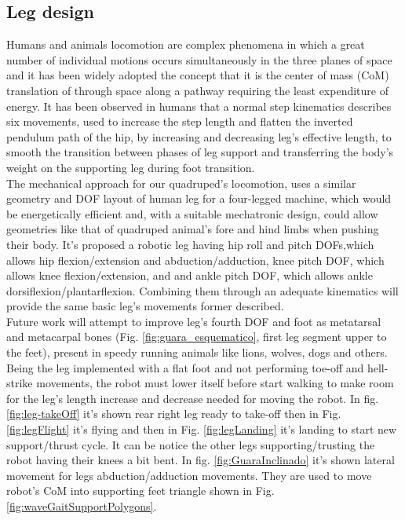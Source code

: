 \subsection{Leg design} 
Humans and animals locomotion are complex phenomena in which a great number of individual motions occurs simultaneously in the three planes of space and it has been widely adopted the concept that it is the center of mass (CoM) translation of through space along a pathway requiring the least expenditure of energy. It has been  observed in humans \cite{inman_major_1953,mcmahon_muscles_1984,mcmahon_mechanics_1984,rose_human_1994} that a normal step kinematics describes six movements, used to increase the step length and flatten the inverted pendulum path of the hip, by increasing and decreasing leg's effective length, to smooth the transition between phases of leg support and transferring the body's weight on the supporting leg during foot transition. \\
The mechanical approach for our quadruped's locomotion, uses  a similar geometry and DOF layout of human leg for a four-legged machine, which would be energetically efficient and, with a suitable mechatronic design, could allow geometries like that of quadruped animal's fore and hind limbs when pushing their body. It's proposed a robotic leg having hip roll and pitch DOFs,which allows hip flexion/extension and abduction/adduction, knee pitch DOF, which allows knee flexion/extension, and and ankle  pitch DOF, which allows ankle dorsiflexion/plantarflexion. Combining them through an adequate kinematics will provide the same basic leg's movements former described.\\
Future work will attempt to improve leg's fourth DOF and foot as metatarsal and metacarpal bones (Fig. \ref{fig:guara_esquematico}, first leg segment upper to the feet), present in speedy running animals like lions, wolves, dogs and others.\\  
Being the leg implemented with a flat foot and not performing toe-off and hell-strike movements, the robot must lower itself before start walking to make room for the leg's length increase and decrease needed for moving the robot. In fig. \ref{fig:leg-takeOff} it's shown rear right leg ready to take-off then in Fig. \ref{fig:legFlight} it's flying and then in Fig. \ref{fig:legLanding} it's landing to start new support/thrust cycle. It can be notice the other legs supporting/trusting the robot having their knees a bit bent. In fig. \ref{fig:GuaraInclinado} it's shown lateral movement for legs abduction/adduction movements. They are used to move robot's CoM into supporting feet triangle shown in Fig. \ref{fig:waveGaitSupportPolygons}.\\
